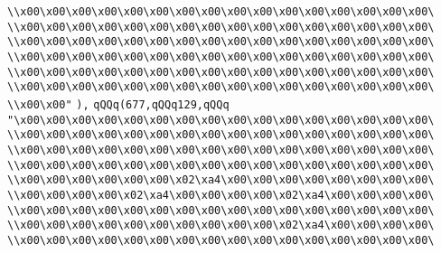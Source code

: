 \verb|\\x00\x00\x00\x00\x00\x00\x00\x00\x00\x00\x00\x00\x00\x00\x00\x00\|\newline
\verb|\\x00\x00\x00\x00\x00\x00\x00\x00\x00\x00\x00\x00\x00\x00\x00\x00\|\newline
\verb|\\x00\x00\x00\x00\x00\x00\x00\x00\x00\x00\x00\x00\x00\x00\x00\x00\|\newline
\verb|\\x00\x00\x00\x00\x00\x00\x00\x00\x00\x00\x00\x00\x00\x00\x00\x00\|\newline
\verb|\\x00\x00\x00\x00\x00\x00\x00\x00\x00\x00\x00\x00\x00\x00\x00\x00\|\newline
\verb|\\x00\x00\x00\x00\x00\x00\x00\x00\x00\x00\x00\x00\x00\x00\x00\x00\|\newline
\verb|\\x00\x00"|\newline
\verb|),|\newline
\verb|qQQq(677,qQQq129,qQQq|\newline
\verb|"\x00\x00\x00\x00\x00\x00\x00\x00\x00\x00\x00\x00\x00\x00\x00\x00\|\newline
\verb|\\x00\x00\x00\x00\x00\x00\x00\x00\x00\x00\x00\x00\x00\x00\x00\x00\|\newline
\verb|\\x00\x00\x00\x00\x00\x00\x00\x00\x00\x00\x00\x00\x00\x00\x00\x00\|\newline
\verb|\\x00\x00\x00\x00\x00\x00\x00\x00\x00\x00\x00\x00\x00\x00\x00\x00\|\newline
\verb|\\x00\x00\x00\x00\x00\x00\x02\xa4\x00\x00\x00\x00\x00\x00\x00\x00\|\newline
\verb|\\x00\x00\x00\x00\x02\xa4\x00\x00\x00\x00\x02\xa4\x00\x00\x00\x00\|\newline
\verb|\\x00\x00\x00\x00\x00\x00\x00\x00\x00\x00\x00\x00\x00\x00\x00\x00\|\newline
\verb|\\x00\x00\x00\x00\x00\x00\x00\x00\x00\x00\x02\xa4\x00\x00\x00\x00\|\newline
\verb|\\x00\x00\x00\x00\x00\x00\x00\x00\x00\x00\x00\x00\x00\x00\x00\x00\|\newline
